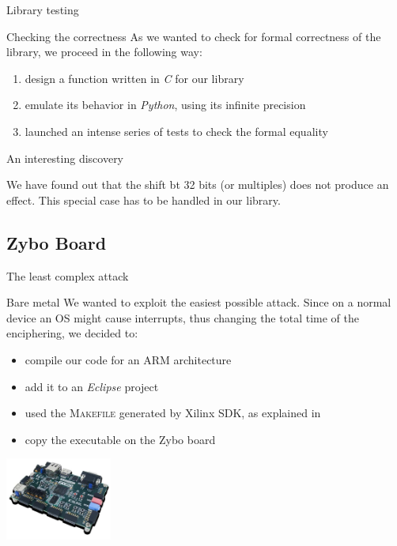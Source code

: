 \documentclass[aspectratio=43]{beamer}
\begin{document}
\begin{frame}{Library testing}
  \begin{block}{Checking the correctness}
    As we wanted to check for formal correctness of the library, we proceed in the following way:
    \begin{enumerate}
      \pause \item design a function written in \textit{C} for our library
      \pause \item emulate its behavior in \textit{Python}, using its infinite precision
      \pause \item launched an intense series of tests to check the formal equality
    \end{enumerate}
  \end{block}

  \pause
  \begin{alert}{An interesting discovery}

    We have found out that the shift bt 32 bits (or multiples) does not produce an effect. This special case has to be handled in our library.
  \end{alert}
\end{frame}

\subsection{Zybo Board}
\begin{frame}{The least complex attack}
	\begin{block}{Bare metal}
		We wanted to exploit the easiest possible attack. Since on a normal device an OS might cause interrupts, thus changing the total time of the enciphering, we decided to:
		\begin{itemize}
			\pause \item compile our code for an ARM architecture
			\pause \item add it to an \textit{Eclipse} project
			\pause \item used the \textsc{Makefile} generated by Xilinx SDK, as explained in \cite{xilinx2015zynq}
			\pause \item copy the executable on the Zybo board
		\end{itemize}
    \begin{center}
      \includegraphics[width=3.5cm]{./graphics/zybo}
    \end{center}
	\end{block}
\end{frame}
\end{document}
